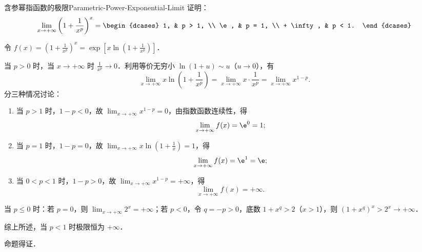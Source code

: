 \begin{problem}{含参幂指函数的极限}{Parametric-Power-Exponential-Limit}
    证明：
    \begin{equation}
        \lim_{x\to +\infty} \left( 1 + \frac{1}{x^p} \right)^x = \begin{dcases} 1, & p > 1, \\ \e, & p = 1, \\ + \infty, & p < 1. \end{dcases}
    \end{equation}
\end{problem}

\begin{myproof}
    令 $f(x) = \left( 1 + \frac{1}{x^p} \right)^x = \exp\left[ x \ln\left( 1 + \frac{1}{x^p} \right) \right]$．

    当 $p > 0$ 时，当 $x \to +\infty$ 时 $\frac{1}{x^p} \to 0$．利用等价无穷小 $\ln(1 + u) \sim u$（$u \to 0$），有
    \begin{equation}
        \lim_{x\to +\infty} x \ln\left( 1 + \frac{1}{x^p} \right) = \lim_{x\to +\infty} x \cdot \frac{1}{x^p} = \lim_{x\to +\infty} x^{1 - p}.
    \end{equation}
    分三种情况讨论：
    \begin{enumerate}
        \item 当 $p > 1$ 时，$1 - p < 0$，故 $\lim_{x\to +\infty} x^{1 - p} = 0$，由指数函数连续性，得
              \begin{equation}
                  \lim_{x\to +\infty} f(x) = \e^0 = 1;
              \end{equation}
        \item 当 $p = 1$ 时，$1 - p = 0$，故 $\lim_{x\to +\infty} x \ln\left( 1 + \frac{1}{x} \right) = 1$，得
              \begin{equation}
                  \lim_{x\to +\infty} f(x) = \e^1 = \e;
              \end{equation}
        \item 当 $0 < p < 1$ 时，$1 - p > 0$，故 $\lim_{x\to +\infty} x^{1 - p} = +\infty$，得
              \begin{equation}
                  \lim_{x\to +\infty} f(x) = +\infty.
              \end{equation}
    \end{enumerate}

    当 $p \leqslant 0$ 时：若 $p = 0$，则 $\lim_{x\to +\infty} 2^x = +\infty$；若 $p < 0$，令 $q = -p > 0$，底数 $1 + x^q > 2$（$x > 1$），则 $(1 + x^q)^x > 2^x \to +\infty$．

    综上所述，当 $p < 1$ 时极限恒为 $+\infty$．

    命题得证．
\end{myproof}

